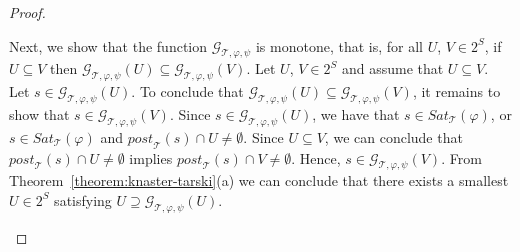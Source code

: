 \documentclass[12pt]{article}
\theoremstyle{definition}
\begin{document}
\begin{proof}
\begin{itemize}
Next, we show that the function $\mathcal{G}_{\mathcal{T}, \varphi,\psi}$ is monotone, that is, for all $U$, $V \in 2^S$, if $U \subseteq V$ then $\mathcal{G}_{\mathcal{T}, \varphi,\psi}(U) \subseteq \mathcal{G}_{\mathcal{T}, \varphi,\psi}(V)$.  Let $U$, $V \in 2^S$ and assume that $U \subseteq V$.  Let $s \in \mathcal{G}_{\mathcal{T}, \varphi,\psi}(U)$. To conclude that $\mathcal{G}_{\mathcal{T}, \varphi,\psi}(U) \subseteq \mathcal{G}_{\mathcal{T}, \varphi,\psi}(V)$, it remains to show that $s \in \mathcal{G}_{\mathcal{T}, \varphi,\psi}(V)$.  Since $s \in \mathcal{G}_{\mathcal{T}, \varphi,\psi}(U)$, we have that $s \in \mathit{Sat}_{\mathcal{T}}(\varphi)$, or $s \in \mathit{Sat}_{\mathcal{T}}(\varphi)$ and $\mathit{post}_{\mathcal{T}}(s) \cap U \not= \emptyset$.  Since $U \subseteq V$, we can conclude that $\mathit{post}_{\mathcal{T}}(s) \cap U \not= \emptyset$ implies $\mathit{post}_{\mathcal{T}}(s) \cap V \not= \emptyset$.  Hence, $s \in \mathcal{G}_{\mathcal{T}, \varphi,\psi}(V)$.  From Theorem~\ref{theorem:knaster-tarski}(a) we can conclude that there exists a smallest $U \in 2^S$ satisfying $U \supseteq \mathcal{G}_{\mathcal{T}, \varphi,\psi}(U)$.


\end{itemize}
\end{proof}
\end{document}

